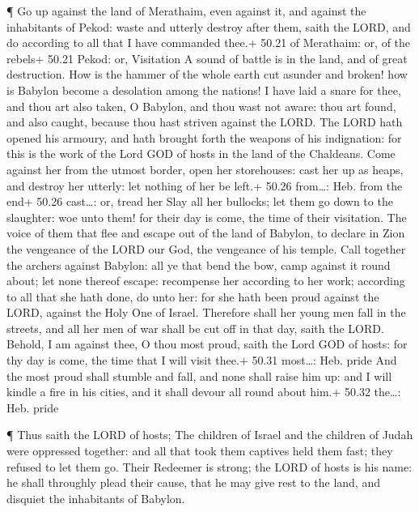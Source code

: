  ¶ Go up against the land of Merathaim, even against it,
and against the inhabitants of Pekod: waste and utterly destroy after
them, saith the LORD, and do according to all that I have commanded
thee.+ 50.21 of Merathaim: or, of the rebels+ 50.21 Pekod: or,
Visitation  A sound of battle is in the land, and of great
destruction.  How is the hammer of the whole earth cut
asunder and broken! how is Babylon become a desolation among the
nations!  I have laid a snare for thee, and thou art also
taken, O Babylon, and thou wast not aware: thou art found, and also
caught, because thou hast striven against the LORD.  The
LORD hath opened his armoury, and hath brought forth the weapons of his
indignation: for this is the work of the Lord GOD of hosts in the land
of the Chaldeans.  Come against her from the utmost border,
open her storehouses: cast her up as heaps, and destroy her utterly: let
nothing of her be left.+ 50.26 from\ldots: Heb. from the end+ 50.26
cast\ldots: or, tread her  Slay all her bullocks; let them
go down to the slaughter: woe unto them! for their day is come, the time
of their visitation.  The voice of them that flee and
escape out of the land of Babylon, to declare in Zion the vengeance of
the LORD our God, the vengeance of his temple.  Call
together the archers against Babylon: all ye that bend the bow, camp
against it round about; let none thereof escape: recompense her
according to her work; according to all that she hath done, do unto her:
for she hath been proud against the LORD, against the Holy One of
Israel.  Therefore shall her young men fall in the streets,
and all her men of war shall be cut off in that day, saith the LORD.
 Behold, I am against thee, O thou most proud, saith the
Lord GOD of hosts: for thy day is come, the time that I will visit
thee.+ 50.31 most\ldots: Heb. pride  And the most proud
shall stumble and fall, and none shall raise him up: and I will kindle a
fire in his cities, and it shall devour all round about him.+ 50.32
the\ldots: Heb. pride

 ¶ Thus saith the LORD of hosts; The children of Israel and
the children of Judah were oppressed together: and all that took them
captives held them fast; they refused to let them go. 
Their Redeemer is strong; the LORD of hosts is his name: he shall
throughly plead their cause, that he may give rest to the land, and
disquiet the inhabitants of Babylon.

